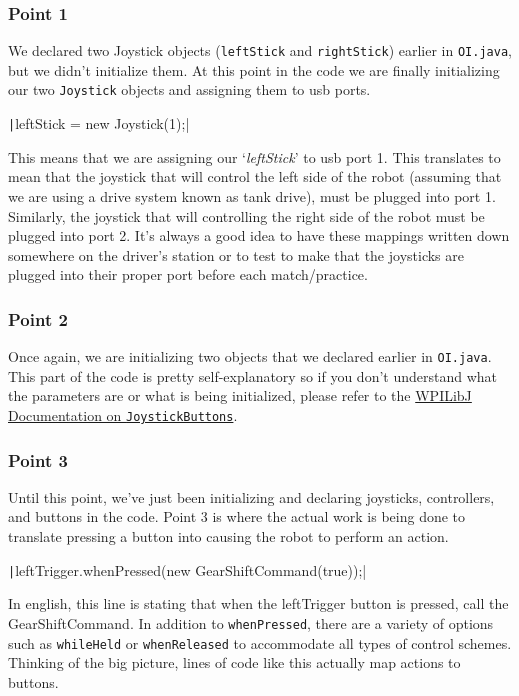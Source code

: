 \documentclass[11pt,fleqn]{article}
\newcommand{\mil}[2][java]{\texttt|#2|}
\begin{document}
\subsubsection{Point 1}
We declared two Joystick objects (\texttt{leftStick} and \texttt{rightStick}) earlier in \texttt{OI.java},
but we didn't initialize them. At this point in the code we are finally initializing our two \texttt{Joystick}
objects and assigning them to usb ports.

\mil{leftStick = new Joystick(1);}

This means that we are assigning our `\textit{leftStick}' to usb port 1. This translates to mean that
the joystick that will control the left side of the robot (assuming that we are using a drive system known
as tank drive), must be plugged into port 1. Similarly, the joystick that will controlling the right side
of the robot must be plugged into port 2. It's always a good idea to have these mappings written down
somewhere on the driver's station or to test to make that the joysticks are plugged into their proper
port before each match/practice.

\subsubsection{Point 2}
Once again, we are initializing two objects that we declared earlier in \texttt{OI.java}. This part of
the code is pretty self-explanatory so if you don't understand what the parameters are or what is being
initialized, please refer to the \href{http://first.wpi.edu/FRC/roborio/release/docs/java/}{WPILibJ Documentation
on \texttt{JoystickButtons}}.

\subsubsection{Point 3}
Until this point, we've just been initializing and declaring joysticks, controllers, and buttons in the
code. Point 3 is where the actual work is being done to translate pressing a button into causing the robot
to perform an action.

\mil{leftTrigger.whenPressed(new GearShiftCommand(true));}

In english, this line is stating that when the leftTrigger button is pressed, call the GearShiftCommand.
In addition to \texttt{whenPressed}, there are a variety of options such as \texttt{whileHeld} or \texttt
{whenReleased} to accommodate all types of control schemes. Thinking of the big picture, lines of code
like this actually map actions to buttons.
\end{document}
